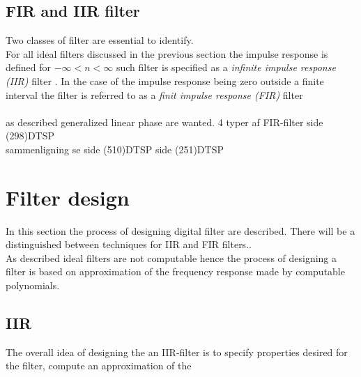 \subsection{FIR and IIR filter} 
Two classes of filter are essential to identify.\\
For all ideal filters discussed in the previous section the impulse response is defined for $-\infty < n < \infty$ such filter is specified as a \textit{infinite impulse response (IIR)} filter . In the case of the impulse response being zero outside a finite interval the filter is referred to as a \textit{finit impulse response (FIR)} filter \\
\\
as described generalized linear phase are wanted. 
4 typer af FIR-filter side (298)DTSP\\
sammenligning se side (510)DTSP
side (251)DTSP 

\section{Filter design}
In this section the process of designing digital filter are described. There will be a distinguished between techniques for IIR and FIR filters..\\
As described ideal filters are not computable hence the process of designing a filter is based on approximation of the frequency response made by computable polynomials.  


\subsection{IIR}
The overall idea of designing the an IIR-filter is to specify properties desired for the filter,    compute an approximation of the    


 



